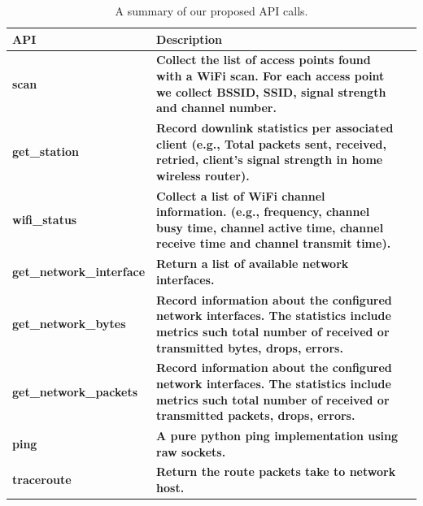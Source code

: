 {\begin{table}
\scriptsize
\centering
\begin{tabular}{|p{}| p{}| m{}|}
\hline
\textbf{API}    &  \textbf{Description} \\
 \hline
 {\bf scan} & {\bf Collect the list of access points found with a WiFi scan. For each access point we collect BSSID, SSID, signal strength and channel number.} \\
\hline
 {\bf get\_station} & {\bf Record downlink statistics per associated client (e.g., Total packets sent, received, retried, client's signal strength in home wireless router).} \\
\hline
 {\bf wifi\_status} & {\bf Collect a list of WiFi channel information. (e.g., frequency, channel busy time, channel active time, channel receive time and channel transmit time).} \\
\hline
 {\bf get\_network\_interface} & {\bf Return a list of available network interfaces.} \\
\hline
 {\bf get\_network\_bytes} & {\bf Record information about the configured network interfaces. The statistics include metrics such total number of received or transmitted bytes, drops, errors.} \\
\hline
 {\bf get\_network\_packets} & {\bf Record information about the configured network interfaces. The statistics include metrics such total number of received or transmitted packets, drops, errors.} \\
\hline
 {\bf ping} & {\bf A pure python ping implementation using raw sockets.} \\
\hline
 {\bf traceroute} & {\bf Return the route packets take to network host. } \\
\hline
\end{tabular}
\caption {A summary of our proposed API calls.}
\label{table:new_api}
\end{table}

}

